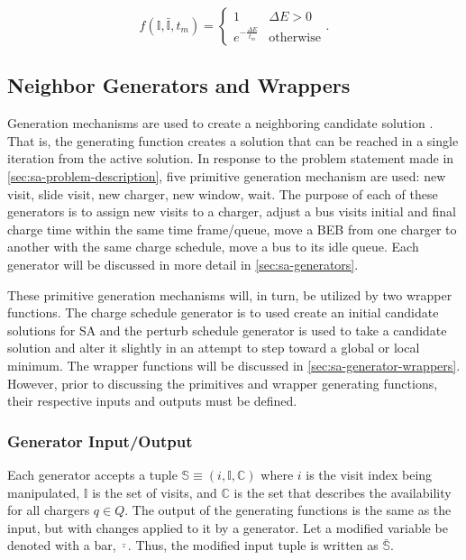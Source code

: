 \documentclass[energies,article,submit,moreauthors]{Definitions/mdpi}
\newcommand{\I}{\mathbb{I}}                 %
\newcommand{\C}{\mathbb{C}}                 %
\newcommand{\Sol}{\mathbb{S}}               %
\newcommand{\Qset}{Q}                       %
\begin{document}
\begin{equation}
\label{eq:candaccept}
f(\I,\bar{\I},t_m) =
\begin{cases}
  1                   & \Delta E > 0 \\
  e^{- \frac{\Delta E}{t_m}} & \text{otherwise}
\end{cases}\text{.}
\end{equation}

\subsection{Neighbor Generators and Wrappers}
\label{sec:sa-generation-mechanisms}
Generation mechanisms are used to create a neighboring candidate solution \cite{gendreau-2018-handb-metah}. That is,
the generating function creates a solution that can be reached in a single iteration from the active solution. In
response to the problem statement made in \ref{sec:sa-problem-description}, five primitive generation mechanism are used: new
visit, slide visit, new charger, new window, wait. The purpose of each of these generators is to assign new visits to a
charger, adjust a bus visits initial and final charge time within the same time frame/queue, move a BEB from one charger
to another with the same charge schedule, move a bus to its idle queue. Each generator will be discussed in more detail
in \ref{sec:sa-generators}.

These primitive generation mechanisms will, in turn, be utilized by two wrapper functions. The charge schedule generator
is to used create an initial candidate solutions for SA and the perturb schedule generator is used to take a candidate
solution and alter it slightly in an attempt to step toward a global or local minimum. The wrapper functions will be
discussed in \ref{sec:sa-generator-wrappers}. However, prior to discussing the primitives and wrapper generating functions,
their respective inputs and outputs must be defined.

\subsubsection{Generator Input/Output}
\label{sec:sa-generator-input-output}
Each generator accepts a tuple \(\Sol \equiv (i, \I, \C)\) where \(i\) is the visit index being manipulated, \(\I\) is the set of
visits, and \(\C\) is the set that describes the availability for all chargers \(q \in \Qset\). The output of the generating
functions is the same as the input, but with changes applied to it by a generator. Let a modified variable be denoted
with a bar, \(\bar{\cdot}\). Thus, the modified input tuple is written as \(\bar{\Sol}\).
\end{document}
